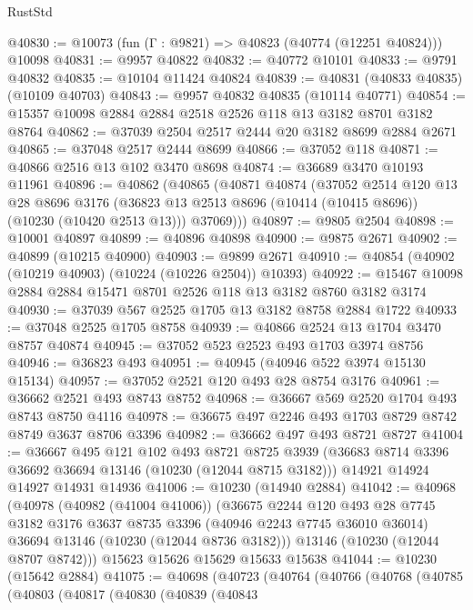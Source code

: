 \begin{lexlean}{RustStd}
\begin{coremodule}
@40830 := @10073 (fun (Γ : @9821) => @40823 (@40774 (@12251 @40824))) @10098
@40831 := @9957 @40822
@40832 := @40772 @10101
@40833 := @9791 @40832
@40835 := @10104 @11424 @40824
@40839 := @40831 (@40833 @40835) (@10109 @40703)
@40843 := @9957 @40832 @40835 (@10114 @40771)
@40854 := @15357 @10098 @2884 @2884 @2518 @2526 @118 @13 @3182 @8701 @3182 @8764
@40862 := @37039 @2504 @2517 @2444 @20 @3182 @8699 @2884 @2671
@40865 := @37048 @2517 @2444 @8699
@40866 := @37052 @118
@40871 := @40866 @2516 @13 @102 @3470 @8698
@40874 := @36689 @3470 @10193 @11961
@40896 := @40862
    (@40865
      (@40871
        @40874
        (@37052
          @2514
          @120
          @13
          @28
          @8696
          @3176
          (@36823 @13 @2513 @8696 (@10414 (@10415 @8696)) (@10230 (@10420 @2513 @13)))
          @37069)))
@40897 := @9805 @2504
@40898 := @10001 @40897
@40899 := @40896 @40898
@40900 := @9875 @2671
@40902 := @40899 (@10215 @40900)
@40903 := @9899 @2671
@40910 := @40854 (@40902 (@10219 @40903) (@10224 (@10226 @2504)) @10393)
@40922 := @15467 @10098 @2884 @2884 @15471 @8701 @2526 @118 @13 @3182 @8760 @3182 @3174
@40930 := @37039 @567 @2525 @1705 @13 @3182 @8758 @2884 @1722
@40933 := @37048 @2525 @1705 @8758
@40939 := @40866 @2524 @13 @1704 @3470 @8757 @40874
@40945 := @37052 @523 @2523 @493 @1703 @3974 @8756
@40946 := @36823 @493
@40951 := @40945 (@40946 @522 @3974 @15130 @15134)
@40957 := @37052 @2521 @120 @493 @28 @8754 @3176
@40961 := @36662 @2521 @493 @8743 @8752
@40968 := @36667 @569 @2520 @1704 @493 @8743 @8750 @4116
@40978 := @36675 @497 @2246 @493 @1703 @8729 @8742 @8749 @3637 @8706 @3396
@40982 := @36662 @497 @493 @8721 @8727
@41004 := @36667
    @495
    @121
    @102
    @493
    @8721
    @8725
    @3939
    (@36683 @8714 @3396 @36692 @36694 @13146 (@10230 (@12044 @8715 @3182)))
    @14921
    @14924
    @14927
    @14931
    @14936
@41006 := @10230 (@14940 @2884)
@41042 := @40968
    (@40978
      (@40982 (@41004 @41006))
      (@36675
        @2244
        @120
        @493
        @28
        @7745
        @3182
        @3176
        @3637
        @8735
        @3396
        (@40946 @2243 @7745 @36010 @36014)
        @36694
        @13146
        (@10230 (@12044 @8736 @3182)))
      @13146
      (@10230 (@12044 @8707 @8742)))
    @15623
    @15626
    @15629
    @15633
    @15638
@41044 := @10230 (@15642 @2884)
@41075 := @40698
    (@40723
      (@40764
        (@40766
          (@40768
            (@40785
              (@40803
                (@40817
                  (@40830
                    (@40839
                      (@40843

\end{coremodule}
\end{lexlean}
